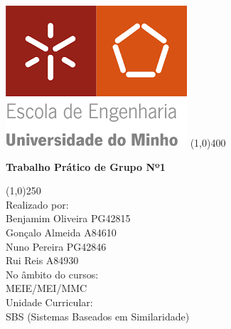 \begin{titlepage}
\begin{center}
\includegraphics[scale=0.6]{uminho.png}
\line(1,0){400}\\
[2mm]
\begin{large}
\textbf{Trabalho Prático de Grupo Nº1}\\ 
\end{large}
\line(1,0){250}\\
[1.5cm]
Realizado por:\\ 
\vspace{5mm}
Benjamim Oliveira PG42815\\
Gonçalo Almeida A84610\\
Nuno Pereira PG42846\\
Rui Reis A84930\\
[4cm]
No âmbito do cursos:\\
MEIE/MEI/MMC\\ 
[2.5cm]
Unidade Curricular:\\
SBS (Sistemas Baseados em Similaridade)
\end{center} 
\end{titlepage}
